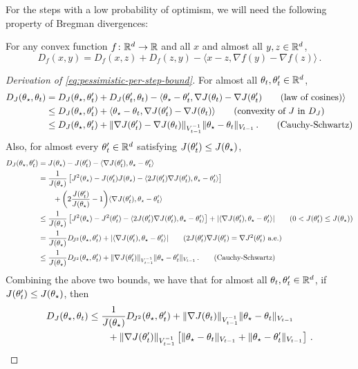 For the steps with a low probability of optimism, we will need the following property of Bregman divergences:

\begin{lemma}
  For any convex function $f \colon \mathbb{R}^d \to \mathbb{R}$ and all $x$ and almost all $y,z \in \mathbb{R}^d$, 
  $$ 
    D_f(x,y) = D_f(x,z) + D_f(z,y) - \langle x-z, \nabla f(y) - \nabla f(z) \rangle\,.
  $$
\end{lemma}

\begin{proof}[Derivation of \cref{eq:pessimistic-per-step-bound}]
For almost all $\theta_t, \theta_t' \in \mathbb{R}^d$,
\begin{align*}
  \Dj(\thetaopt, \thetat) 
    &= \Dj(\thetaopt, \thetat') + \Dj(\thetat', \thetat) - \langle \thetaopt - \thetat', \nabla J(\thetat) - \nabla J (\thetat') \tag{law of cosines} \rangle \\
    &\leq \Dj(\thetaopt, \thetat') + \langle \thetaopt - \thetat, \nabla J(\thetat') - \nabla J(\thetat) \rangle \tag{convexity of $J$ in $\Dj$} \\
    &\leq \Dj(\thetaopt, \thetat') + \vinvnorm{\nabla J(\thetat') - \nabla J(\thetat)} \vnorm{\thetaopt - \thetat}\,. \tag{Cauchy-Schwartz}
\end{align*}
Also, for almost every $\theta_t' \in \mathbb{R}^d$ satisfying $J(\theta_t') \leq J(\theta_\star)$, 
\begin{align*}
  \Dj(\thetaopt, \thetat') 
    &= J(\thetaopt) - J(\thetat') - \langle \nabla J(\thetat'), \thetaopt - \thetat' \rangle \\
    &= \frac{1}{J(\thetaopt)} \left[ J^2(\thetaopt) - J(\thetat') J(\thetaopt) - \langle 2J(\thetat') \nabla J(\thetat') , \thetaopt - \thetat' \rangle \right] \\ &\qquad + \bigg(2\frac{J(\thetat')}{J(\thetaopt)} - 1\bigg) \langle \nabla J(\thetat'), \thetaopt - \thetat'\rangle \\
    &\leq \frac{1}{J(\thetaopt)} \left[ J^2(\thetaopt) - J^2(\thetat') - \langle 2 J(\thetat') \nabla J(\thetat') , \thetaopt - \thetat' \rangle \right] + |\langle \nabla J(\thetat'), \thetaopt - \thetat'\rangle| \tag{$0 < J(\thetat') \leq J(\thetaopt)$} \\
    &=  \frac{1}{J(\thetaopt)} \Djj(\thetaopt, \thetat') + |\langle \nabla J(\thetat'), \thetaopt - \thetat'\rangle| \tag{$2J(\thetat') \nabla J(\thetat') = \nabla J^2(\thetat')$ a.e.}\\
    &\leq \frac{1}{J(\thetaopt)}
     \Djj(\thetaopt, \thetat') + \vinvnorm{\nabla J(\thetat')} \vnorm{\thetaopt - \thetat'}\,. \tag{Cauchy-Schwartz}
\end{align*}
Combining the above two bounds, we have that for almost all $\theta_t,\theta_t' \in \mathbb{R}^d$, if $J(\theta_t') \leq J(\theta_\star)$, then
\begin{align}
  D_{J}(\theta_\star, \theta_t) &\leq \frac{1}{J(\theta_\star)} D_{\!J^2}(\theta_\star, \theta_t') + \|\nabla J(\theta_t)\|_{V_{t-1}^{-1}} \|\theta_\star - \theta_t\|_{V_{t-1}}\nonumber \\ 
  &\quad\quad+ \|\nabla J(\theta_t')\|_{V_{t-1}^{-1}} \left[\|\theta_\star - \theta_t\|_{V_{t-1}} + \|\theta_\star - \theta_t'\|_{V_{t-1}}\right]\,.\label{eq:pessimistic-ineq}
\end{align}


\end{proof}
